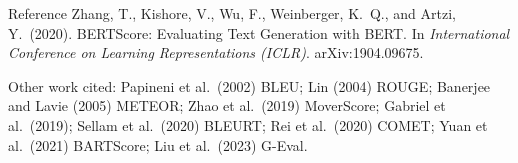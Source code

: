 \documentclass[aspectratio=169,11pt]{beamer}
\begin{document}
\begin{frame}{Reference}
  \small
  Zhang, T., Kishore, V., Wu, F., Weinberger, K.\ Q., and Artzi, Y.\ (2020). BERTScore: Evaluating Text Generation with BERT. In \emph{International Conference on Learning Representations (ICLR)}. arXiv:1904.09675.
  \vspace{3mm}

  {\footnotesize Other work cited: Papineni et al.\ (2002) BLEU; Lin (2004) ROUGE; Banerjee and Lavie (2005) METEOR; Zhao et al.\ (2019) MoverScore; Gabriel et al.\ (2019); Sellam et al.\ (2020) BLEURT; Rei et al.\ (2020) COMET; Yuan et al.\ (2021) BARTScore; Liu et al.\ (2023) G-Eval.}
\end{frame}
\end{document}
